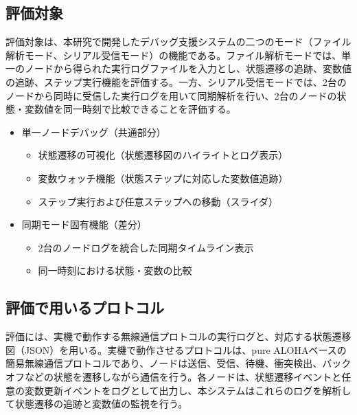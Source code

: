 \documentclass[12pt]{jreport}
\begin{document}
\subsection{評価対象}
\begin{par}
評価対象は、本研究で開発したデバッグ支援システムの二つのモード（ファイル解析モード、シリアル受信モード）の機能である。ファイル解析モードでは、単一のノードから得られた実行ログファイルを入力とし、状態遷移の追跡、変数値の追跡、ステップ実行機能を評価する。一方、シリアル受信モードでは、2台のノードから同時に受信した実行ログを用いて同期解析を行い、2台のノードの状態・変数値を同一時刻で比較できることを評価する。
\end{par}

\begin{itemize}
  \item 単一ノードデバッグ（共通部分）
    \begin{itemize}
      \item 状態遷移の可視化（状態遷移図のハイライトとログ表示）
      \item 変数ウォッチ機能（状態ステップに対応した変数値追跡）
      \item ステップ実行および任意ステップへの移動（スライダ）
    \end{itemize}
  \item 同期モード固有機能（差分）
    \begin{itemize}
      \item 2台のノードログを統合した同期タイムライン表示
      \item 同一時刻における状態・変数の比較
    \end{itemize}
\end{itemize}

\subsection{評価で用いるプロトコル}
\begin{par}
評価には、実機で動作する無線通信プロトコルの実行ログと、対応する状態遷移図（JSON）を用いる。実機で動作させるプロトコルは、pure ALOHAベースの簡易無線通信プロトコルであり、ノードは送信、受信、待機、衝突検出、バックオフなどの状態を遷移しながら通信を行う。各ノードは、状態遷移イベントと任意の変数更新イベントをログとして出力し、本システムはこれらのログを解析して状態遷移の追跡と変数値の監視を行う。
\end{par}

\end{document}
